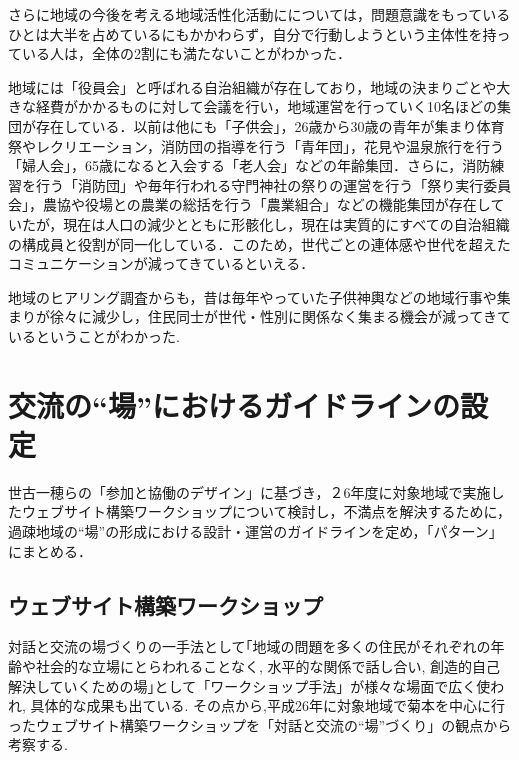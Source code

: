 \documentclass[a4paper]{jsarticle}
\begin{document}
さらに地域の今後を考える地域活性化活動にについては，問題意識をもっているひとは大半を占めているにもかかわらず，自分で行動しようという主体性を持っている人は，全体の2割にも満たないことがわかった．\par
地域には「役員会」と呼ばれる自治組織が存在しており，地域の決まりごとや大きな経費がかかるものに対して会議を行い，地域運営を行っていく10名ほどの集団が存在している．以前は他にも「子供会」，26歳から30歳の青年が集まり体育祭やレクリエーション，消防団の指導を行う「青年団」，花見や温泉旅行を行う「婦人会」，65歳になると入会する「老人会」などの年齢集団．さらに，消防練習を行う「消防団」や毎年行われる守門神社の祭りの運営を行う「祭り実行委員会」，農協や役場との農業の総括を行う「農業組合」などの機能集団が存在していたが，現在は人口の減少とともに形骸化し，現在は実質的にすべての自治組織の構成員と役割が同一化している．このため，世代ごとの連体感や世代を超えたコミュニケーションが減ってきているといえる．\par
地域のヒアリング調査からも，昔は毎年やっていた子供神輿などの地域行事や集まりが徐々に減少し，住民同士が世代・性別に関係なく集まる機会が減ってきているということがわかった.

\newpage
\section{交流の“場”におけるガイドラインの設定}
世古一穂らの「参加と協働のデザイン」\cite{13}に基づき，２6年度に対象地域で実施したウェブサイト構築ワークショップについて検討し，不満点を解決するために，過疎地域の“場”の形成における設計・運営のガイドラインを定め，「パターン」にまとめる．
\subsection{ウェブサイト構築ワークショップ}
対話と交流の場づくりの一手法として｢地域の問題を多くの住民がそれぞれの年齢や社会的な立場にとらわれることなく, 水平的な関係で話し合い, 創造的自己解決していくための場｣\cite{14}として「ワークショップ手法」が様々な場面で広く使われ, 具体的な成果も出ている. その点から,平成26年に対象地域で菊本\cite{15}を中心に行ったウェブサイト構築ワークショップを「対話と交流の“場”づくり」の観点から考察する.
\end{document}

